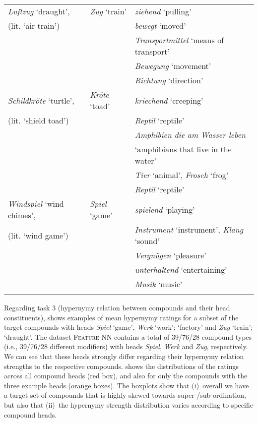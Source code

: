 \documentclass[output=paper,colorlinks,citecolor=brown]{langscibook}
\begin{document}
\begin{table}
\begin{tabularx}{\textwidth}{p{3.2cm}p{2.2cm}p{7.2cm}}
\textit{Luftzug} `draught',  & \textit{Zug} `train' & \textit{ziehend} `pulling'\\
\hspace*{+6mm} (lit. `air train') & & \textit{bewegt} `moved'\\
& &	\textit{Transportmittel} `means of transport'\\
& &	\textit{Bewegung} `movement'\\
& &	\textit{Richtung} `direction' \\
\midrule

\textit{Schildkröte} `turtle',  & \textit{Kröte} `toad' & \textit{kriechend} `creeping'\\
\hspace*{+6mm} (lit. `shield toad') & & \textit{Reptil} `reptile'\\
& &	\textit{Amphibien die am Wasser leben}\\
& & \hspace*{+3mm} `amphibians that live in the water'\\
& &	\textit{Tier} `animal', \textit{Frosch} `frog'\\
& &	\textit{Reptil} `reptile'\\
\midrule

\textit{Windspiel} `wind chimes', & \textit{Spiel} `game' &	\textit{spielend} `playing'\\
\hspace*{+6mm} (lit. `wind game') & & \textit{Instrument} `instrument', \textit{Klang} `sound'\\
& &	\textit{Vergnügen} `pleasure'\\
& &	\textit{unterhaltend} `entertaining'\\
& &	\textit{Musik} `music'\\

  \lspbottomrule
  \end{tabularx}

\end{table}

Regarding task 3 (hypernymy relation between compounds and their head constituents),  shows examples of mean hypernymy ratings for a subset of the target compounds with heads \textit{Spiel} `game', \textit{Werk} `work'; `factory' and \textit{Zug} `train'; `draught'. The dataset \textsc{Feature-NN} contains a total of 39/76/28 compound types (i.e., 39/76/28 different modifiers) with heads \textit{Spiel}, \textit{Werk} and \textit{Zug}, respectively.
%
We can see that these heads strongly differ regarding their hypernymy relation strengths to the respective compounds.  shows the distributions of the ratings across all compound heads (red box), and also for only the compounds with the three example heads (orange boxes). The boxplots show that (i)~overall we have a target set of compounds that is highly skewed towards super-/sub-ordination, but also that (ii)~the hypernymy strength distribution varies according to specific compound heads.
\end{document}

